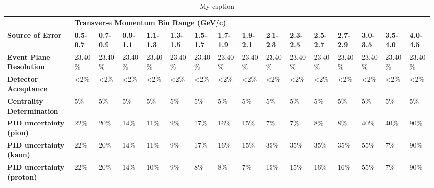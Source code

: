 \begin{table}[]
\centering
\caption{My caption}
\label{my-label}
\begin{tabular}{llllllllllllllll}
                                  & \multicolumn{15}{l}{\textbf{Transverse Momentum Bin Range (GeV/c)}}                                                                                                                                                                                                                        \\
\rowcolor[HTML]{C0C0C0} 
\textbf{Source of Error}          & \textbf{0.5-0.7} & \textbf{0.7-0.9} & \textbf{0.9-1.1} & \textbf{1.1-1.3} & \textbf{1.3-1.5} & \textbf{1.5-1.7} & \textbf{1.7-1.9} & \textbf{1.9-2.1} & \textbf{2.1-2.3} & \textbf{2.3-2.5} & \textbf{2.5-2.7} & \textbf{2.7-2.9} & \textbf{3.0-3.5} & \textbf{3.5-4.0} & \textbf{4.0-4.5} \\
\textbf{Event Plane Resolution}   & 23.40\%          & 23.40\%          & 23.40\%          & 23.40\%          & 23.40\%          & 23.40\%          & 23.40\%          & 23.40\%          & 23.40\%          & 23.40\%          & 23.40\%          & 23.40\%          & 23.40\%          & 23.40\%          & 23.40\%          \\
\textbf{Detector Acceptance}      & \textless2\%     & \textless2\%     & \textless2\%     & \textless2\%     & \textless2\%     & \textless2\%     & \textless2\%     & \textless2\%     & \textless2\%     & \textless2\%     & \textless2\%     & \textless2\%     & \textless2\%     & \textless2\%     & \textless2\%     \\
\textbf{Centrality Determination} & 5\%              & 5\%              & 5\%              & 5\%              & 5\%              & 5\%              & 5\%              & 5\%              & 5\%              & 5\%              & 5\%              & 5\%              & 5\%              & 5\%              & 5\%              \\
\textbf{PID uncertainty (pion)}   & 22\%             & 20\%             & 14\%             & 11\%             & 9\%              & 17\%             & 16\%             & 15\%             & 7\%              & 7\%              & 8\%              & 8\%              & 40\%             & 40\%             & 90\%             \\
\textbf{PID uncertainty (kaon)}   & 22\%             & 20\%             & 14\%             & 11\%             & 9\%              & 17\%             & 16\%             & 15\%             & 35\%             & 35\%             & 35\%             & 35\%             & 55\%             & 7\%              & 90\%             \\
\textbf{PID uncertainty (proton)} & 22\%             & 20\%             & 14\%             & 10\%             & 9\%              & 8\%              & 8\%              & 7\%              & 15\%             & 15\%             & 16\%             & 16\%             & 55\%             & 7\%              & 90\%            
\end{tabular}
\end{table}



\pagebreak
\pagebreak
